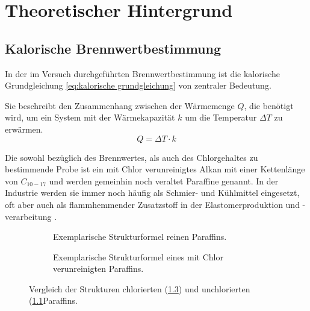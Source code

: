 \chapter{Theoretischer Hintergrund}\label{sec:theo hintergrund}
	\section*{Kalorische Brennwertbestimmung}
		In der im Versuch durchgeführten Brennwertbestimmung ist die kalorische Grundgleichung \cref{eq:kalorische grundgleichung}
		von zentraler Bedeutung.

		Sie beschreibt den Zusammenhang zwischen der Wärmemenge \(Q\), die benötigt wird, um ein System mit der Wärmekapazität \(k\) um die
		Temperatur \(\Delta T\) zu erwärmen.
		\begin{equation}
			Q = \Delta T \cdot k
			\label{eq:kalorische grundgleichung}
		\end{equation}

		Die sowohl bezüglich des Brennwertes, als auch des Chlorgehaltes zu bestimmende Probe ist ein mit Chlor verunreinigtes Alkan mit einer
		Kettenlänge von \(C_{10-17}\) und werden gemeinhin noch veraltet Paraffine genannt. In der Industrie werden sie immer noch häufig als
		Schmier- und Kühlmittel eingesetzt, oft aber auch als flammhemmender Zusatzstoff in der Elastomerproduktion und -verarbeitung \cite{chloro.paraffine.short-chain,chloro.paraffine.mid-chain}.
		\begin{figure}[h]
			\centering
			\begin{subfigure}[t]{.6\textwidth}
				\centering
				
				\caption{Exemplarische Strukturformel reinen Paraffins.}
				\label{subfig:paraffin rein}
			\end{subfigure}
			\par\bigskip
			\begin{subfigure}[b]{.6\textwidth}
				\centering
				
				\caption{Exemplarische Strukturformel eines mit Chlor verunreinigten Paraffins.}
				\label{subfig:paraffin ckw}
			\end{subfigure}
			\caption[Vergleich der Strukturen chlorierten und unchlorierten Paraffins]{Vergleich der Strukturen chlorierten (\cref{subfig:paraffin ckw}) und unchlorierten (\cref{subfig:paraffin rein}Paraffins.}
		\end{figure}

